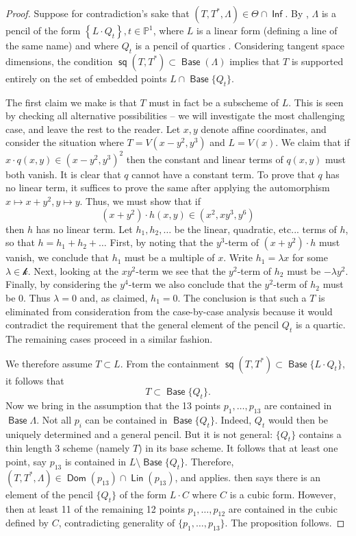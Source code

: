 \documentclass{article}
\renewcommand{\P}{\mathbb{P}}
\renewcommand{\k}{\mathscr{k}}
\DeclareMathOperator{\s}{\mathsf{sq}}
\DeclareMathOperator{\Dom}{\mathsf{Dom}}
\DeclareMathOperator{\Inf}{\mathsf{Inf}}
\DeclareMathOperator{\Lin}{\mathsf{Lin}}
\DeclareMathOperator{\Base}{\mathsf{Base}}
\begin{document}
\begin{proof}
    Suppose for contradiction's sake that $(T,T^{*},\Lambda) \in \Theta \cap \Inf$. By , $\Lambda$ is a pencil of the form $\left\{L \cdot Q_{t}\right\}, t\in \P^{1}$, where $L$ is a linear form (defining a line of the same name) and where $Q_{t}$ is a pencil of quartics .  Considering tangent space dimensions, the condition $\s(T,T^{*}) \subset \Base (\Lambda)$ implies that $T$ is supported entirely on the set of embedded points $L \cap \Base \{Q_{t}\}$. 

    The first claim we make is that $T$ must in fact be a subscheme of $L$.  This is seen by checking all alternative possibilities -- we will investigate the most challenging case, and leave the rest to the reader.  Let $x,y$ denote affine coordinates, and consider the situation where  $T = V(x-y^{2},y^{3})$ and $L = V(x)$. We claim that if $x \cdot q(x,y) \in (x-y^{2},y^{3})^{2}$ then the constant and linear terms of $q(x,y)$ must both vanish.  It is clear that $q$ cannot have a constant term. To prove that $q$  has no linear term, it suffices to prove the same after applying the automorphism $x \mapsto x+y^{2},  y \mapsto y$.  Thus, we must show that if $$(x+y^{2}) \cdot h(x,y) \in (x^{2},xy^{3},y^{6})$$ then $h$ has no linear term. Let $h_{1},h_{2}, \dots$ be the linear, quadratic, etc... terms of $h$, so that $h = h_1 + h_2 + \dots$  First, by noting that the $y^{3}$-term of $(x+y^{2}) \cdot h$ must vanish, we conclude that $h_{1}$ must be a multiple of $x$. Write   $h_{1}=\lambda x$ for some $\lambda \in \k$.  Next, looking at the $xy^{2}$-term  we see that the $y^{2}$-term of $h_{2}$ must be $-\lambda y^{2}$.  Finally, by considering the $y^{4}$-term we also conclude that the $y^{2}$-term of $h_{2}$ must be $0$.  Thus $\lambda = 0$ and, as claimed, $h_{1}=0$.  The conclusion is that such a $T$ is eliminated from consideration from the case-by-case analysis because it would contradict the requirement that the general element of the pencil $Q_{t}$ is a  quartic.  The remaining cases proceed in a similar fashion.

    We therefore assume $T \subset L$.  From the containment $\s(T,T^{*}) \subset \Base \{L \cdot Q_{t}\}$, it follows that $$T \subset \Base \{Q_{t}\}.$$ Now we bring in the assumption that the 13  points $p_{1} , \dots, p_{13}$ are contained in $\Base \Lambda$.  Not all $p_{i}$ can be contained in $\Base \{Q_{t}\}$.  Indeed, $Q_t$ would then be uniquely determined and a general pencil.  But it is not general: $\{Q_{t}\}$ contains a thin length $3$ scheme (namely $T$) in its base scheme.  It follows that at least one point, say $p_{13}$ is contained in $L \setminus \Base \{Q_{t}\}.$  Therefore, $(T,T^{*},\Lambda) \in \Dom(p_{13}) \cap \Lin(p_{13})$, and  applies.   then says there is an element of the pencil $\{Q_{t}\}$ of the form $L \cdot C$ where $C$ is a cubic form.  However, then at least 11 of the remaining 12 points $p_{1}, \dots, p_{12}$ are contained in the cubic defined by $C$, contradicting generality of $\{p_{1}, \dots, p_{13}\}$.  The proposition follows. 
\end{proof}
\end{document}
